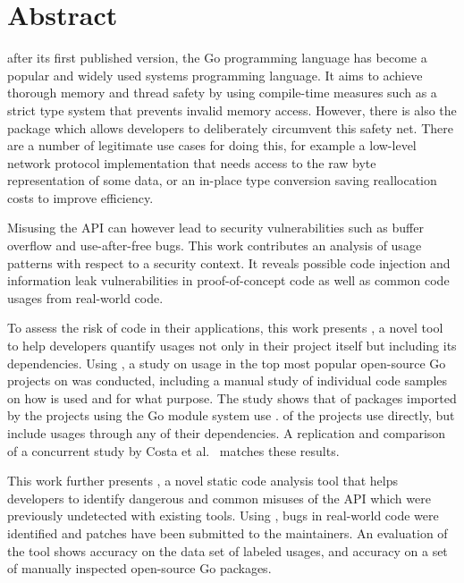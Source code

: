 \chapter*{Abstract}

 after its first published version, the Go programming language has become a popular and
widely used systems programming language.
It aims to achieve thorough memory and thread safety by using compile-time measures such as a strict type system that
prevents invalid memory access.
However, there is also the \unsafe{} package which allows developers to deliberately circumvent this safety net.
There are a number of legitimate use cases for doing this, for example a low-level network protocol implementation that
needs access to the raw byte representation of some data, or an in-place type conversion saving reallocation costs to
improve efficiency.

Misusing the \unsafe{} API can however lead to security vulnerabilities such as buffer overflow and use-after-free bugs.
This work contributes an analysis of \unsafe{} usage patterns with respect to a security context.
It reveals possible code injection and information leak vulnerabilities in proof-of-concept code as well as common code
usages from real-world code.

To assess the risk of \unsafe{} code in their applications, this work presents \toolGeiger{}, a novel tool to help
developers quantify \unsafe{} usages not only in their project itself but including its dependencies.
Using \toolGeiger{}, a study on \unsafe{} usage in the top \projsTotal{} most popular open-source Go projects on
\github{} was conducted, including a manual study of \numberLabeledCodeSnippets{} individual code samples on how
\unsafe{} is used and for what purpose.
The study shows that \percentageUnsafePackages{} of packages imported by the projects using the Go module system use
\unsafe{}.
\percentageUnsafeProjects{} of the projects use \unsafe{} directly, but \percentageUnsafeTransitiveWithDependencies{}
include \unsafe{} usages through any of their dependencies.
A replication and comparison of a concurrent study by Costa et al.~\cite{costa2020} matches these results.

This work further presents \toolSafer{}, a novel static code analysis tool that helps developers to identify
 dangerous and common misuses of the \unsafe{} API which were previously undetected with existing tools.
Using \toolSafer{}, \numberBugsFixed{} bugs in real-world code were identified and patches have been submitted to the
maintainers.
An evaluation of the tool shows \goSaferEvaluationDatasetGosaferAccuracy{} accuracy on the data set of labeled \unsafe{}
usages, and \goSaferEvaluationPackagesGosaferAccuracy{} accuracy on a set of manually inspected open-source Go packages.


